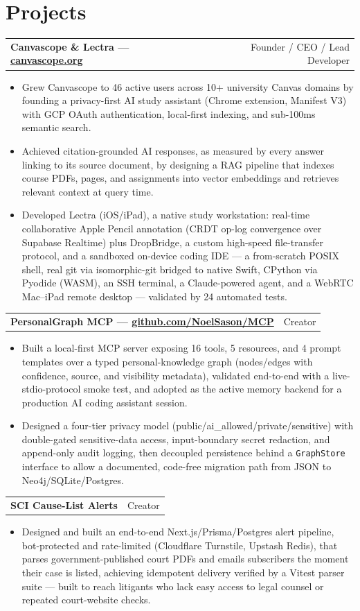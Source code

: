 \documentclass[letterpaper,11pt]{article}
\makeatletter
\newcommand{\resumeSubheadingSimple}[2]{
  \begin{tabular*}{\textwidth}[t]{@{}l@{\extracolsep{\fill}}r@{}}
    \textbf{#1} & \small #2
  \end{tabular*}\vspace{1pt}
}
\newcommand{\resumeItem}[1]{\item\small{#1}}
\newcommand{\resumeItemListStart}{\begin{itemize}[leftmargin=16pt, label=\textbullet, topsep=0pt, parsep=0pt, itemsep=2pt]}
\newcommand{\resumeItemListEnd}{\end{itemize}\vspace{1pt}}
\makeatother
\begin{document}
\section{Projects}
\resumeSubheadingSimple
  {Canvascope \& Lectra --- \small\href{https://canvascope.org}{canvascope.org}}{Founder / CEO / Lead Developer}
\resumeItemListStart
  \resumeItem{Grew Canvascope to 46 active users across 10+ university Canvas domains by founding a privacy-first AI study assistant (Chrome extension, Manifest V3) with GCP OAuth authentication, local-first indexing, and sub-100ms semantic search.}
  \resumeItem{Achieved citation-grounded AI responses, as measured by every answer linking to its source document, by designing a RAG pipeline that indexes course PDFs, pages, and assignments into vector embeddings and retrieves relevant context at query time.}
  \resumeItem{Developed Lectra (iOS/iPad), a native study workstation: real-time collaborative Apple Pencil annotation (CRDT op-log convergence over Supabase Realtime) plus DropBridge, a custom high-speed file-transfer protocol, and a sandboxed on-device coding IDE --- a from-scratch POSIX shell, real git via isomorphic-git bridged to native Swift, CPython via Pyodide (WASM), an SSH terminal, a Claude-powered agent, and a WebRTC Mac--iPad remote desktop --- validated by 24 automated tests.}
\resumeItemListEnd

\resumeSubheadingSimple
  {PersonalGraph MCP --- \small\href{https://github.com/NoelSason/MCP}{github.com/NoelSason/MCP}}{Creator}
\resumeItemListStart
  \resumeItem{Built a local-first MCP server exposing 16 tools, 5 resources, and 4 prompt templates over a typed personal-knowledge graph (nodes/edges with confidence, source, and visibility metadata), validated end-to-end with a live-stdio-protocol smoke test, and adopted as the active memory backend for a production AI coding assistant session.}
  \resumeItem{Designed a four-tier privacy model (public/ai\_allowed/private/sensitive) with double-gated sensitive-data access, input-boundary secret redaction, and append-only audit logging, then decoupled persistence behind a \texttt{GraphStore} interface to allow a documented, code-free migration path from JSON to Neo4j/SQLite/Postgres.}
\resumeItemListEnd

\resumeSubheadingSimple
  {SCI Cause-List Alerts}{Creator}
\resumeItemListStart
  \resumeItem{Designed and built an end-to-end Next.js/Prisma/Postgres alert pipeline, bot-protected and rate-limited (Cloudflare Turnstile, Upstash Redis), that parses government-published court PDFs and emails subscribers the moment their case is listed, achieving idempotent delivery verified by a Vitest parser suite --- built to reach litigants who lack easy access to legal counsel or repeated court-website checks.}
\resumeItemListEnd
\end{document}
